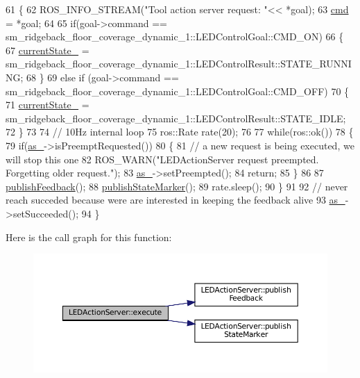 \begin{DoxyCode}
61 \{
62   ROS\_INFO\_STREAM(\textcolor{stringliteral}{"Tool action server request: "}<< *goal);
63   \hyperlink{classLEDActionServer_a4d3a4c07e7659cdd78228932bb1634d3}{cmd} = *goal;
64 
65   \textcolor{keywordflow}{if}(goal->command == sm\_ridgeback\_floor\_coverage\_dynamic\_1::LEDControlGoal::CMD\_ON)
66   \{
67     \hyperlink{classLEDActionServer_a1dc456e987dc331501ad6ff2215661ff}{currentState\_} =  sm\_ridgeback\_floor\_coverage\_dynamic\_1::LEDControlResult::STATE\_RUNNING;
68   \}
69   \textcolor{keywordflow}{else}  \textcolor{keywordflow}{if} (goal->command == sm\_ridgeback\_floor\_coverage\_dynamic\_1::LEDControlGoal::CMD\_OFF)
70   \{
71     \hyperlink{classLEDActionServer_a1dc456e987dc331501ad6ff2215661ff}{currentState\_} =  sm\_ridgeback\_floor\_coverage\_dynamic\_1::LEDControlResult::STATE\_IDLE;
72   \}
73 
74   \textcolor{comment}{// 10Hz internal loop}
75   ros::Rate rate(20);
76 
77   \textcolor{keywordflow}{while}(ros::ok())
78   \{
79     \textcolor{keywordflow}{if}(\hyperlink{classLEDActionServer_a61d21c77642081acf017d4ebd65b2de0}{as\_}->isPreemptRequested())
80     \{
81        \textcolor{comment}{// a new request is being executed, we will stop this one}
82        ROS\_WARN(\textcolor{stringliteral}{"LEDActionServer request preempted. Forgetting older request."});
83        \hyperlink{classLEDActionServer_a61d21c77642081acf017d4ebd65b2de0}{as\_}->setPreempted(); 
84        \textcolor{keywordflow}{return};
85     \}
86     
87     \hyperlink{classLEDActionServer_a25c93d4e7ecdacbb4f5b090d7789aa36}{publishFeedback}();
88     \hyperlink{classLEDActionServer_a73bb754ac2347c50660624ad92315895}{publishStateMarker}();
89     rate.sleep();
90   \}
91 
92    \textcolor{comment}{// never reach succeded because were are interested in keeping the feedback alive}
93    \hyperlink{classLEDActionServer_a61d21c77642081acf017d4ebd65b2de0}{as\_}->setSucceeded();
94 \}
\end{DoxyCode}
Here is the call graph for this function\+:
\nopagebreak
\begin{figure}[H]
\begin{center}
\leavevmode
\includegraphics[width=350pt]{classLEDActionServer_aa7de924a8ea5f74b85d14782f4661a67_cgraph}
\end{center}
\end{figure}
\mbox{\label{classLEDActionServer_a25c93d4e7ecdacbb4f5b090d7789aa36}} 
